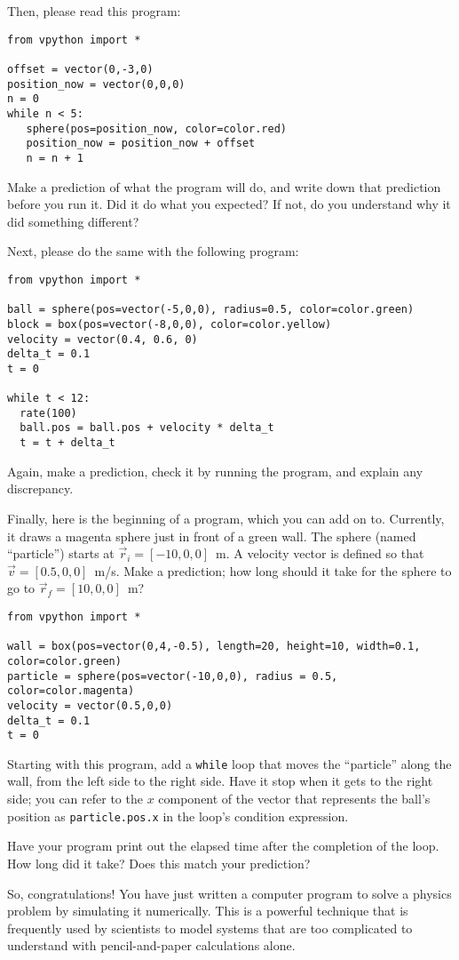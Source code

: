 \documentclass[10pt]{article}
\begin{document}
\medskip

\noindent Then, please read this program:
{\small{
\begin{verbatim}
from vpython import *

offset = vector(0,-3,0)
position_now = vector(0,0,0)
n = 0
while n < 5:
   sphere(pos=position_now, color=color.red)
   position_now = position_now + offset
   n = n + 1
\end{verbatim}
}}
\noindent Make a prediction of what the program will do, and write down that prediction 
before you run it.  Did it do what you expected?  If not, do you understand
why it did something different?


\noindent Next, please do the same with the following program:
{\small{
\begin{verbatim}
from vpython import *

ball = sphere(pos=vector(-5,0,0), radius=0.5, color=color.green)
block = box(pos=vector(-8,0,0), color=color.yellow)
velocity = vector(0.4, 0.6, 0)
delta_t = 0.1
t = 0

while t < 12:
  rate(100)
  ball.pos = ball.pos + velocity * delta_t
  t = t + delta_t
\end{verbatim}
}}
\noindent Again, make a prediction, check it by running the program, and explain
any discrepancy.

Finally, here is the beginning of a program, which you can add on to.
Currently, it draws a magenta sphere just in front of a green wall.
The sphere (named ``particle'') starts at $\vec{r}_i = [-10, 0, 0]$~m.  
A velocity vector is defined so that $\vec{v} = [0.5, 0, 0]$~m/s.
Make a prediction; how long should it take for the sphere to go to
$\vec{r}_f = [10, 0, 0]$~m?

{\small{
\begin{verbatim}
from vpython import *

wall = box(pos=vector(0,4,-0.5), length=20, height=10, width=0.1, color=color.green)
particle = sphere(pos=vector(-10,0,0), radius = 0.5, color=color.magenta)
velocity = vector(0.5,0,0)
delta_t = 0.1
t = 0
\end{verbatim}
}}
Starting with this program, add a {\texttt {while}} loop that moves the ``particle''  
along the wall, from the left side to the right side.  Have it stop when it 
gets to the right side; you can refer to the $x$ component of the vector that 
represents the ball's position as {\texttt {particle.pos.x}} in the loop's 
condition expression. 

Have your program print out the elapsed time after the completion of the
loop.  How long did it take?  Does this match your prediction?

So, congratulations!  You have just written a computer program to solve
a physics problem by simulating it numerically.  This is a powerful technique 
that is frequently used by scientists to model systems that are too 
complicated to understand with pencil-and-paper calculations alone.
\end{document}
